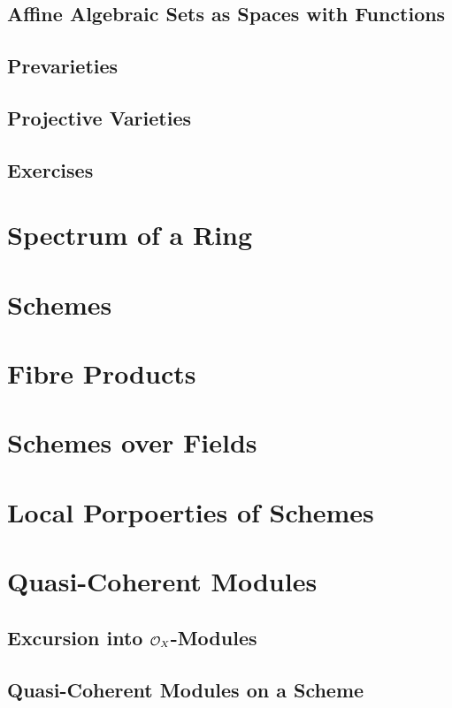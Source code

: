 \subsection{Affine Algebraic Sets as Spaces with Functions}

\subsection{Prevarieties}

\subsection{Projective Varieties}

\subsection{Exercises}

\section{Spectrum of a Ring}

\section{Schemes}

\section{Fibre Products}

\section{Schemes over Fields}

\section{Local Porpoerties of Schemes}

\section{Quasi-Coherent Modules}

\subsection{Excursion into $\mathcal{O}_X$-Modules}
\subsection{Quasi-Coherent Modules on a Scheme}
